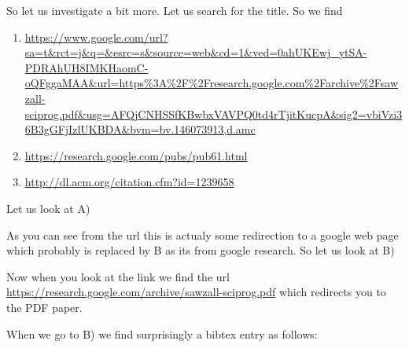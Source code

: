 So let us investigate a bit more. Let us search for the title. So we find
\begin{enumerate}
\item {} 
\url{https://www.google.com/url?sa=t\&rct=j\&q=\&esrc=s\&source=web\&cd=1\&ved=0ahUKEwj\_ytSA-PDRAhUH8IMKHaomC-oQFggaMAA\&url=https\%3A\%2F\%2Fresearch.google.com\%2Farchive\%2Fsawzall-sciprog.pdf\&usg=AFQjCNHSSfKBwbxVAVPQ0td4rTjitKucpA\&sig2=vbiVzi36B3gGFjIzlUKBDA\&bvm=bv.146073913,d.amc}

\item {} 
\url{https://research.google.com/pubs/pub61.html}

\item {} 
\url{http://dl.acm.org/citation.cfm?id=1239658}

\end{enumerate}

Let us look at A)

As you can see from the url this is actualy some redirection to a
google web page which probably is replaced by B as its from google
research. So let us look at B)

Now when you look at the link we find the url
\url{https://research.google.com/archive/sawzall-sciprog.pdf} which
redirects you to the PDF paper.

When we go to B) we find surprisingly a bibtex entry as follows:

\begin{sphinxVerbatim}[commandchars=\\\{\}]
          
              
    
    
      
    
    
\end{sphinxVerbatim}

